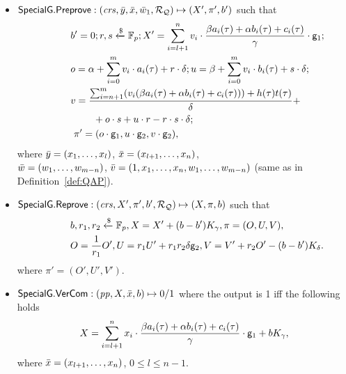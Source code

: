 \begin{definition}
\begin{itemize}
\begin{comment}
{We should say what is the difference from Groth16.Setup or it is the same. I think in general in $ \SpecialG $, you should tell which part is from Groth16 or Legosnark and where we change it while describing the algorithms. It will be much clear for the reader to verify. You have notes in the end but I think it is better to have it while describing since you can tell more right away from the algorithm than in the end of everything}
\end{comment}
\item ${\mathsf{SpecialG}}.{\mathsf{Preprove}}: (\mathit{crs}, \bar{y}, \bar{x}, \bar{w}_1, \mathcal{R}_{\mathcal{Q}}) \mapsto (X', \pi', b')$ such that \\
\begin{align*}
&\ \ \ \ \ \ \ \   b' = 0; r, s\xleftarrow{\$} \mathbb{F}_p; X' = \sum_{i=l+1}^{n} v_i \cdot  \frac{\beta a_i(\tau)+ \alpha b_i(\tau)+ c_i(\tau)}{\gamma} \cdot \mathsf{g}_1;  \\
&\ \ \ \ \ \ \ \  o = \alpha + \sum_{i=0}^{m} v_i \cdot a_i(\tau) + r \cdot \delta; u = \beta + \sum_{i=0}^{m} v_i \cdot b_i(\tau) + s \cdot \delta; \\ 
&\ \ \ \ \ \ \ \   v = \frac{\sum_{i=n+1}^{m} (v_i (\beta a_i(\tau)+ \alpha b_i(\tau)+ c_i(\tau))) + h(\tau)t(\tau)}{\delta}   + \\ 
& \ \ \ \ \ \ \ \ \ \ \ \ \  \ \   + o\cdot s + u \cdot r - r \cdot s \cdot \delta; \\
&\ \ \ \ \ \ \ \ \ \pi' = (o \cdot \mathsf{g}_1, u \cdot \mathsf{g}_2, v \cdot \mathsf{g}_2), 
\end{align*}
where $\bar{y} = (x_1, \ldots, x_l)$, $\bar{x} = (x_{l+1}, \ldots, x_n)$, \\
$\bar{w} = (w_1, \ldots, w_{m-n})$, $\bar{v} = (1, x_1, \ldots, x_n, w_1, \ldots, w_{m-n})$ (same as in Definition~\ref{def:QAP}).

\item ${\mathsf{SpecialG}}.{\mathsf{Reprove}}: (\mathit{crs}, X', \pi', b', \mathcal{R}_{\mathcal{Q}}) \mapsto (X, \pi, b)$  such that
\begin{align*}
&\ \ \ \ \ \ \ \  b , r_1, r_2  \xleftarrow{\$} \mathbb{F}_p, X = X' + (b- b') K_{\gamma}, \pi = (O, U, V), \\
&\ \ \ \ \ \ \ \ O = \frac{1}{r_1} O', U = r_1 U' + r_1r_2 \delta \mathsf{g}_2, V = V' + r_2O'  - (b - b') K_{\delta} .
\end{align*}
\noindent where $\pi' = (O', U', V')$.
 
\item ${\mathsf{SpecialG}}.{\mathsf{VerCom}}: (\mathit{pp}, X, \bar{x}, b) \mapsto 0/1$ where the output is 1 iff the following holds
$$X = \sum_{i=l+1}^{n} x_i \cdot  \frac{\beta a_i(\tau)+ \alpha b_i(\tau)+ c_i(\tau)}{\gamma} \cdot \mathsf{g}_1  + b K_{\gamma},$$
where $\bar{x} = (x_{l+1}, \ldots, x_n)$, $ 0 \leq l \leq n-1$. 


\end{itemize}
\end{definition}
